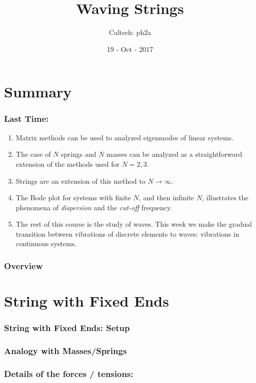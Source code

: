 \documentclass[pdf, hideothersubsections]{beamer}
\begin{document}
\title{Waving Strings}  
\author{Caltech: ph2a}
\date{19 - Oct - 2017}


\frame{\titlepage} 



\section{Summary}
\begin{frame}
\frametitle{Last Time:}
\begin{enumerate}
  \pause
\item Matrix methods can be used to analyzed eigenmodes of linear systems.
  \pause
\item The case of $N$ springs and $N$ masses can be analyzed as a
  straightforward extension of the methods used for $N = 2, 3$.
  \pause
\item Strings are an extension of this method to $N \rightarrow \infty$.
  \pause
\item The Bode plot for systems with finite $N$, and then 
  infinite $N$, illustrates the phenomena of \emph{dispersion} and the
  \emph{cut-off} frequency.
\pause
\item The rest of this course is the study of waves. This week we make
  the gradual transition between vibrations of discrete elements to
  waves: vibrations in continuous systems.
\end{enumerate}
\end{frame}


\begin{frame}
\frametitle{Overview}

\end{frame}


\section{String with Fixed Ends}
\begin{frame}
\frametitle{String with Fixed Ends: Setup}

\end{frame}

\begin{frame}
\frametitle{Analogy with Masses/Springs}


\end{frame}


\begin{frame}
\frametitle{Details of the forces / tensions:}

\end{frame}
\end{document}
